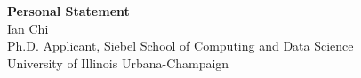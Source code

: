 \documentclass[11pt]{article}
\begin{document}
\begin{center}
    {\Large \textbf{Personal Statement}}\\[4pt]
    {\large Ian Chi}\\[2pt]
    Ph.D. Applicant, Siebel School of Computing and Data Science\\
    University of Illinois Urbana-Champaign
\end{center}

\vspace{1em}

\end{document}
